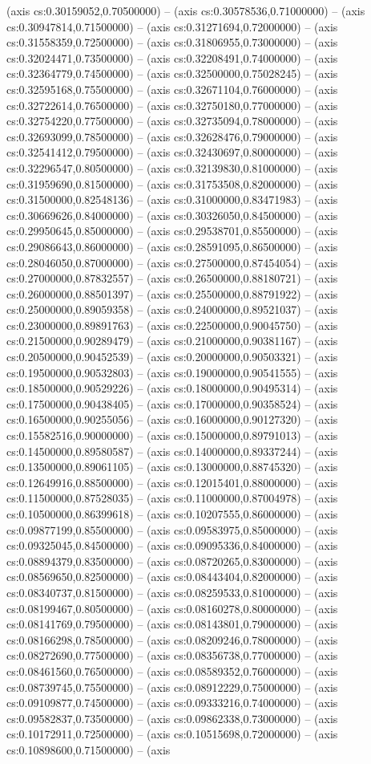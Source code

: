 (axis cs:0.30159052,0.70500000) -- (axis cs:0.30578536,0.71000000) -- (axis cs:0.30947814,0.71500000) -- (axis cs:0.31271694,0.72000000) -- (axis cs:0.31558359,0.72500000) -- (axis cs:0.31806955,0.73000000) -- (axis cs:0.32024471,0.73500000) -- (axis cs:0.32208491,0.74000000) -- (axis cs:0.32364779,0.74500000) -- (axis cs:0.32500000,0.75028245) -- (axis cs:0.32595168,0.75500000) -- (axis cs:0.32671104,0.76000000) -- (axis cs:0.32722614,0.76500000) -- (axis cs:0.32750180,0.77000000) -- (axis cs:0.32754220,0.77500000) -- (axis cs:0.32735094,0.78000000) -- (axis cs:0.32693099,0.78500000) -- (axis cs:0.32628476,0.79000000) -- (axis cs:0.32541412,0.79500000) -- (axis cs:0.32430697,0.80000000) -- (axis cs:0.32296547,0.80500000) -- (axis cs:0.32139830,0.81000000) -- (axis cs:0.31959690,0.81500000) -- (axis cs:0.31753508,0.82000000) -- (axis cs:0.31500000,0.82548136) -- (axis cs:0.31000000,0.83471983) -- (axis cs:0.30669626,0.84000000) -- (axis cs:0.30326050,0.84500000) -- (axis cs:0.29950645,0.85000000) -- (axis cs:0.29538701,0.85500000) -- (axis cs:0.29086643,0.86000000) -- (axis cs:0.28591095,0.86500000) -- (axis cs:0.28046050,0.87000000) -- (axis cs:0.27500000,0.87454054) -- (axis cs:0.27000000,0.87832557) -- (axis cs:0.26500000,0.88180721) -- (axis cs:0.26000000,0.88501397) -- (axis cs:0.25500000,0.88791922) -- (axis cs:0.25000000,0.89059358) -- (axis cs:0.24000000,0.89521037) -- (axis cs:0.23000000,0.89891763) -- (axis cs:0.22500000,0.90045750) -- (axis cs:0.21500000,0.90289479) -- (axis cs:0.21000000,0.90381167) -- (axis cs:0.20500000,0.90452539) -- (axis cs:0.20000000,0.90503321) -- (axis cs:0.19500000,0.90532803) -- (axis cs:0.19000000,0.90541555) -- (axis cs:0.18500000,0.90529226) -- (axis cs:0.18000000,0.90495314) -- (axis cs:0.17500000,0.90438405) -- (axis cs:0.17000000,0.90358524) -- (axis cs:0.16500000,0.90255056) -- (axis cs:0.16000000,0.90127320) -- (axis cs:0.15582516,0.90000000) -- (axis cs:0.15000000,0.89791013) -- (axis cs:0.14500000,0.89580587) -- (axis cs:0.14000000,0.89337244) -- (axis cs:0.13500000,0.89061105) -- (axis cs:0.13000000,0.88745320) -- (axis cs:0.12649916,0.88500000) -- (axis cs:0.12015401,0.88000000) -- (axis cs:0.11500000,0.87528035) -- (axis cs:0.11000000,0.87004978) -- (axis cs:0.10500000,0.86399618) -- (axis cs:0.10207555,0.86000000) -- (axis cs:0.09877199,0.85500000) -- (axis cs:0.09583975,0.85000000) -- (axis cs:0.09325045,0.84500000) -- (axis cs:0.09095336,0.84000000) -- (axis cs:0.08894379,0.83500000) -- (axis cs:0.08720265,0.83000000) -- (axis cs:0.08569650,0.82500000) -- (axis cs:0.08443404,0.82000000) -- (axis cs:0.08340737,0.81500000) -- (axis cs:0.08259533,0.81000000) -- (axis cs:0.08199467,0.80500000) -- (axis cs:0.08160278,0.80000000) -- (axis cs:0.08141769,0.79500000) -- (axis cs:0.08143801,0.79000000) -- (axis cs:0.08166298,0.78500000) -- (axis cs:0.08209246,0.78000000) -- (axis cs:0.08272690,0.77500000) -- (axis cs:0.08356738,0.77000000) -- (axis cs:0.08461560,0.76500000) -- (axis cs:0.08589352,0.76000000) -- (axis cs:0.08739745,0.75500000) -- (axis cs:0.08912229,0.75000000) -- (axis cs:0.09109877,0.74500000) -- (axis cs:0.09333216,0.74000000) -- (axis cs:0.09582837,0.73500000) -- (axis cs:0.09862338,0.73000000) -- (axis cs:0.10172911,0.72500000) -- (axis cs:0.10515698,0.72000000) -- (axis cs:0.10898600,0.71500000) -- (axis 